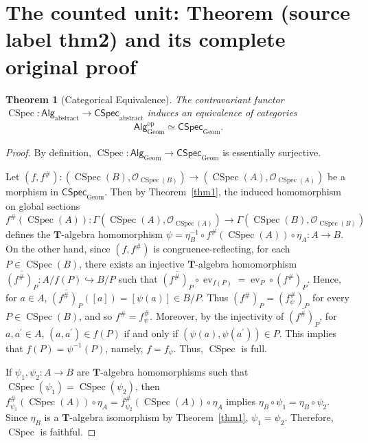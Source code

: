 \documentclass[10pt,a4paper]{amsart}
\theoremstyle{plain}
\newtheorem{theorem}{Theorem}[section]
\theoremstyle{definition}
\begin{document}
\section{The counted unit: Theorem (source label thm2) and its complete original proof}

\begin{theorem}[Categorical Equivalence]
    \label{thm2}
The contravariant functor $\operatorname{CSpec} : \mathsf{Alg}_{\mathrm{abstract}} \to \mathsf{CSpec}_{\mathrm{abstract}}$ induces an equivalence of categories
\begin{align*}
\mathsf{Alg}_{\mathrm{Geom}}^{\mathrm{op}}
\simeq
\mathsf{CSpec}_{\mathrm{Geom}}.
\end{align*}
\end{theorem}

\begin{proof}
By definition, $\operatorname{CSpec} : \mathsf{Alg}_{\mathrm{Geom}} \to \mathsf{CSpec}_{\mathrm{Geom}}$ is essentially surjective. 

Let $(f,f^{\#}): (\operatorname{CSpec}(B), \mathcal{O}_{\operatorname{CSpec}(B)}) \to (\operatorname{CSpec}(A), \mathcal{O}_{\operatorname{CSpec}(A)})$ be a morphism in $\mathsf{CSpec}_{\mathrm{Geom}}$.
Then by Theorem~\ref{thm1}, the induced homomorphism on global sections $f^{\#}(\operatorname{CSpec}(A)) : \Gamma(\operatorname{CSpec}(A),\mathcal{O}_{\operatorname{CSpec}(A)}) \to \Gamma(\operatorname{CSpec}(B), \mathcal{O}_{\operatorname{CSpec}(B)})$ defines the $\boldsymbol{T}$-algebra homomorphism $\psi = \eta_B^{-1} \circ f^{\#}(\operatorname{CSpec}(A)) \circ \eta_A : A \to B$.
On the other hand, since $(f, f^{\#})$ is congruence-reflecting, for each $P \in \operatorname{CSpec}(B)$, there exists an injective $\boldsymbol{T}$-algebra homomorphism $\overline{(f^{\#})_P}:A/f(P) \hookrightarrow B/P$ such that $\overline{(f^{\#})_P} \circ \operatorname{ev}_{f(P)} =\operatorname{ev}_P \circ (f^{\#})_P$.
Hence, for $a \in A$, $\overline{(f^{\#})_P}([a]) = [\psi(a)] \in B / P$.
Thus $(f^{\#})_P = (f_{\psi}^{\#})_P$ for every $P \in \operatorname{CSpec}(B)$, and so $f^{\#} = f_{\psi}^{\#}$.
Moreover, by the injectivity of $\overline{(f^{\#})_P}$, for $a, a^{\prime} \in A$, $(a, a^{\prime}) \in f(P)$ if and only if $(\psi(a), \psi(a^{\prime})) \in P$.
This implies that $f(P) = \psi^{-1}(P)$, namely, $f = f_{\psi}$.
Thus, $\operatorname{CSpec}$ is full.

If $\psi_1, \psi_2 : A \to B$ are $\boldsymbol{T}$-algebra homomorphisms such that $\operatorname{CSpec}(\psi_1) = \operatorname{CSpec}(\psi_2)$, then $f_{\psi_1}^{\#}(\operatorname{CSpec}(A)) \circ \eta_A = f_{\psi_2}^{\#}(\operatorname{CSpec}(A)) \circ \eta_A$ implies $\eta_B \circ \psi_1 = \eta_B \circ \psi_2$.
Since $\eta_B$ is a $\boldsymbol{T}$-algebra isomorphism by Theorem~\ref{thm1}, $\psi_1 = \psi_2$.
Therefore, $\operatorname{CSpec}$ is faithful.
\end{proof}
\end{document}
